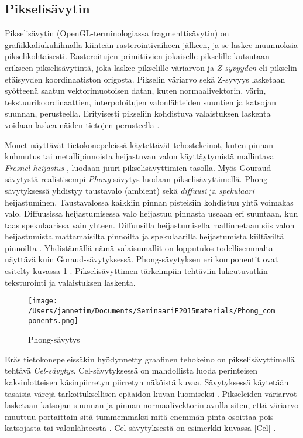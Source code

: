 \documentclass[finnish]{tktltiki2}
\theoremstyle{definition}
\theoremstyle{remark}
\begin{document}
\subsection{Pikselisävytin}

Pikselisävytin (OpenGL-terminologiassa fragmenttisävytin) on grafiikkaliukuhihnalla kiinteän rasterointivaiheen jälkeen, ja se laskee muunnoksia pikselikohtaisesti. Rasteroitujen primitiivien jokaiselle pikselille kutsutaan erikseen pikselisävytintä, joka laskee pikselille väriarvon ja \emph{Z-syvyyden} eli pikselin etäisyyden koordinaatiston origosta. Pikselin väriarvo sekä Z-syvyys lasketaan syötteenä saatun vektorimuotoisen datan, kuten normaalivektorin, värin, tekstuurikoordinaattien, interpoloitujen valonlähteiden suuntien ja katsojan suunnan, perusteella. Erityisesti pikseliin kohdistuva valaistuksen laskenta voidaan laskea näiden tietojen perusteella \cite[s. 389-390]{Puh08}.

Monet näyttävät tietokonepeleissä käytettävät tehostekeinot, kuten pinnan kuhmutus tai metallipinnoista heijastuvan valon käyttäytymistä mallintava \emph{Fresnel-heijastus} \cite{Laz05}, luodaan juuri pikselisävyttimien tasolla. Myös Gouraud-sävytystä realistisempi \emph{Phong}-sävytys luodaan pikselisävyttimellä. Phong-sävytyksessä yhdistyy taustavalo (ambient) sekä \emph{diffuusi} ja \emph{spekulaari} heijastuminen. Taustavalossa kaikkiin pinnan pisteisiin kohdistuu yhtä voimakas valo. Diffuusissa heijastumisessa valo heijastuu pinnasta useaan eri suuntaan, kun taas spekulaarissa vain yhteen. Diffuusilla heijastumisella mallinnetaan siis valon heijastumista mattamaisilta pinnoilta ja spekulaarilla heijastumista kiiltäviltä pinnoilta \cite[s. 231-239]{Puh08}. Yhdistämällä nämä valaisumallit on lopputulos todellisemmalta näyttävä kuin Goraud-sävytyksessä. Phong-sävytyksen eri komponentit ovat esitelty kuvassa \ref{Phong} \cite{Smi06}. Pikselisävyttimen tärkeimpiin tehtäviin lukeutuvatkin teksturointi ja valaistuksen laskenta.

\begin{figure}[!htbp]
\texttt{[image: /Users/jannetim/Documents/SeminaariF2015materials/Phong\_components.png]}
\caption{Phong-sävytys}
\label{Phong}
\end{figure}

Eräs tietokonepeleissäkin hyödynnetty graafinen tehokeino on pikselisävyttimellä tehtävä \emph{Cel-sävytys}. Cel-sävytyksessä on mahdollista luoda perinteisen kaksiulotteisen käsinpiirretyn piirretyn näköistä kuvaa. Sävytyksessä käytetään tasaisia värejä tarkoituksellisen epäaidon kuvan luomiseksi \cite{Luq12}. Pikseleiden väriarvot lasketaan katsojan suunnan ja pinnan normaalivektorin avulla siten, että väriarvo muuttuu portaittain sitä tummemmaksi mitä enemmän pinta osoittaa pois katsojasta tai valonlähteestä \cite[s. 402-404]{Puh08}. Cel-sävytyksestä on esimerkki kuvassa \ref{Cel} \cite{Sou07}. 
\end{document}

